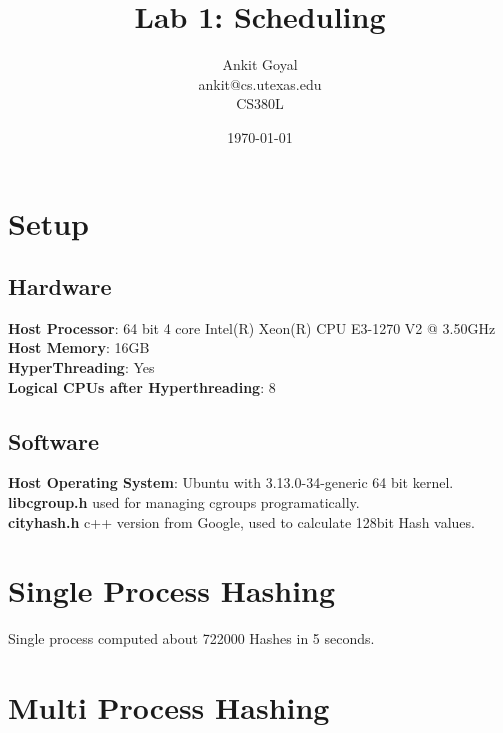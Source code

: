 \documentclass[10pt] {article}
\author{Ankit Goyal \\ankit@cs.utexas.edu \\ CS380L}
\title{Lab 1: Scheduling}
\date{\today}
\begin{document}
\maketitle

\section{Setup}
\subsection{Hardware}
\textbf{Host Processor}: 64 bit 4 core Intel(R) Xeon(R) CPU E3-1270 V2 @ 3.50GHz\\
\textbf{Host Memory}: 16GB \\
\textbf{HyperThreading}: Yes \\
\textbf{Logical CPUs after Hyperthreading}: 8

\subsection{Software}
\textbf{Host Operating System}: Ubuntu with 3.13.0-34-generic 64 bit kernel.\\
\textbf{libcgroup.h} used for managing cgroups programatically.\\
\textbf{cityhash.h} c++ version from Google, used to calculate 128bit Hash values.


\section{Single Process Hashing}

Single process computed about 722000 Hashes in 5 seconds.


\section{Multi Process Hashing}
\end{document}
